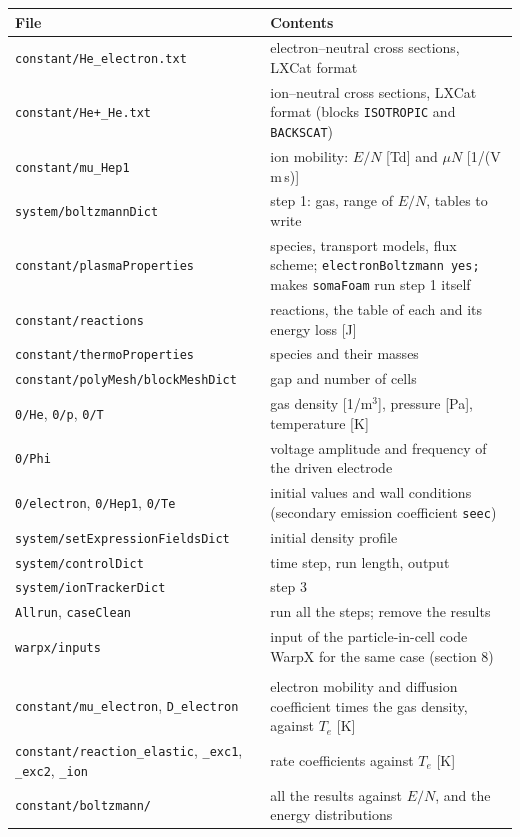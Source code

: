 \documentclass[10pt,a4paper]{article}
\newcommand{\kw}[1]{\texttt{#1}}
\begin{document}
\begin{longtable}{@{}>{\raggedright\arraybackslash}p{6.1cm}>{\raggedright\arraybackslash}p{9.7cm}@{}}
\toprule
File & Contents \\
\midrule
\kw{constant/He\_electron.txt} & electron--neutral cross sections, LXCat
  format \\
\kw{constant/He+\_He.txt} & ion--neutral cross sections, LXCat format
  (blocks \kw{ISOTROPIC} and \kw{BACKSCAT}) \\
\kw{constant/mu\_Hep1} & ion mobility: $E/N$ [Td] and $\mu N$
  [1/(V\,m\,s)] \\
\kw{system/boltzmannDict} & step 1: gas, range of $E/N$, tables to write \\
\kw{constant/plasmaProperties} & species, transport models, flux scheme;
  \kw{electronBoltzmann yes;} makes \kw{somaFoam} run step 1 itself \\
\kw{constant/reactions} & reactions, the table of each and its energy loss
  [J] \\
\kw{constant/thermoProperties} & species and their masses \\
\kw{constant/polyMesh/blockMeshDict} & gap and number of cells \\
\kw{0/He}, \kw{0/p}, \kw{0/T} & gas density [1/m$^3$], pressure [Pa],
  temperature [K] \\
\kw{0/Phi} & voltage amplitude and frequency of the driven electrode \\
\kw{0/electron}, \kw{0/Hep1}, \kw{0/Te} & initial values and wall conditions
  (secondary emission coefficient \kw{seec}) \\
\kw{system/setExpressionFieldsDict} & initial density profile \\
\kw{system/controlDict} & time step, run length, output \\
\kw{system/ionTrackerDict} & step 3 \\
\kw{Allrun}, \kw{caseClean} & run all the steps; remove the results \\
\kw{warpx/inputs} & input of the particle-in-cell code WarpX for the same
  case (section 8) \\
\midrule
\multicolumn{2}{@{}l}{Written by step 1:} \\
\kw{constant/mu\_electron}, \kw{D\_electron} & electron mobility and
  diffusion coefficient times the gas density, against $T_e$ [K] \\
\kw{constant/reaction\_elastic}, \kw{\_exc1}, \kw{\_exc2}, \kw{\_ion} &
  rate coefficients against $T_e$ [K] \\
\kw{constant/boltzmann/} & all the results against $E/N$, and the energy
  distributions \\
\bottomrule
\end{longtable}
\end{document}
